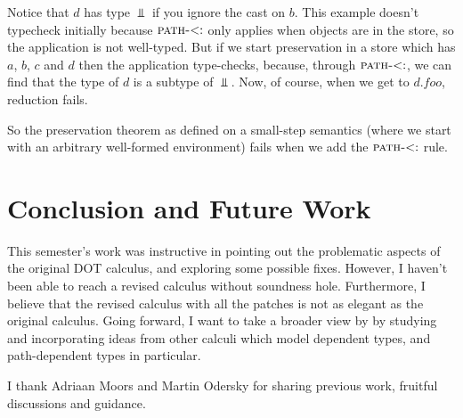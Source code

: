 \documentclass[preprint]{sigplanconf}
\begin{document}
Notice that $d$ has type $\Bot$ if you ignore the cast on $b$. This
example doesn't typecheck initially because $\textsc{path-$<:$}$
only applies when objects are in the store, so the application is not
well-typed. But if we start preservation in a store which has $a$,
$b$, $c$ and $d$ then the application type-checks, because, through
$\textsc{path-$<:$}$, we can find that the type of $d$ is a subtype
of $\Bot$. Now, of course, when we get to $d.\mathit{foo}$, reduction
fails.

So the preservation theorem as defined on a small-step semantics
(where we start with an arbitrary well-formed environment) fails when
we add the $\textsc{path-$<:$}$ rule.

\section{Conclusion and Future Work}\label{conclusion}
This semester's work was instructive in pointing out the problematic
aspects of the original DOT calculus, and exploring some possible
fixes. However, I haven't been able to reach a revised calculus
without soundness hole. Furthermore, I believe that the revised
calculus with all the patches is not as elegant as the original
calculus. Going forward, I want to take a broader view by by studying
and incorporating ideas from other calculi which model dependent
types, and path-dependent types in particular.

\acks

I thank Adriaan Moors and Martin Odersky for sharing previous work,
fruitful discussions and guidance.

%
%
\end{document}
